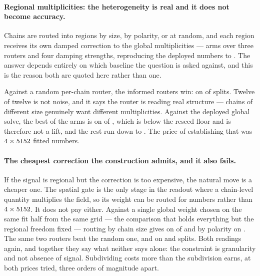 \documentclass[11pt]{article}
\begin{document}
\paragraph{Regional multiplicities: the heterogeneity is real and it does not
become accuracy.} Chains are routed into \GateRouteRegions{} regions by size, by
polarity, or at random, and each region receives its own damped correction to the
global multiplicities --- \HierArms{} arms over three routers and four damping
strengths, reproducing the deployed numbers to \HierRepro{}. The answer depends
entirely on which baseline the question is asked against, and this is the reason
both are quoted here rather than one.

Against a random per-chain router, the informed routers win: \HierBestVsRandom{}
on \HierBestVsRandomSplits{} of \LadderSplits{} splits. Twelve of twelve is not
noise, and it says the router is reading real structure --- chains of different
size genuinely want different multiplicities. Against the deployed global solve,
the best of the \HierArms{} arms is \HierBestVsDeployed{} on
\HierBestVsDeployedSplits{} of \LadderSplits{}, which is below the \SatReseed{}
reseed floor and is therefore not a lift, and the rest run down to
\HierWorstVsDeployed{}. The price of establishing that was \(4{}
\times 5152{}\) fitted numbers.

\paragraph{The cheapest correction the construction admits, and it also fails.}
If the signal is regional but the correction is too expensive, the natural move is
a cheaper one. The spatial gate is the only stage in the readout where a
chain-level quantity multiplies the field, so its weight can be routed for
\GateRouteRegions{} numbers rather than \(4{} \times
5152{}\). It does not pay either. Against a single global weight
chosen on the same fit half from the same grid --- the comparison that holds
everything but the regional freedom fixed --- routing by chain size gives
\GateRouteSize{} on \GateRouteSizeSplits{} of \LadderSplits{} and by polarity
\GateRoutePolarity{} on \GateRoutePolaritySplits{}. The same two routers beat the
random one, \GateRouteSizeVsRandom{} and \GateRoutePolarityVsRandom{} on
\GateRouteSizeVsRandomSplits{} and \GateRoutePolarityVsRandomSplits{} splits. Both
readings again, and together they say what neither says alone: the constraint is
granularity and not absence of signal. Subdividing costs more than the
subdivision earns, at both prices tried, three orders of magnitude apart.
\end{document}
